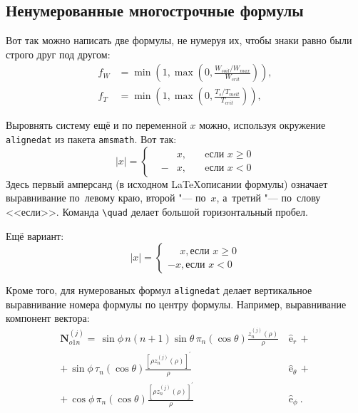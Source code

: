 \subsection{Ненумерованные многострочные формулы} \label{subsect1_3_2}

Вот так можно написать две формулы, не нумеруя их, чтобы знаки равно были строго друг под другом:
\begin{align}
	f_W & =  \min \left( 1, \max \left( 0, \frac{W_{soil} / W_{max}}{W_{crit}} \right)  \right), \nonumber \\
	f_T & =  \min \left( 1, \max \left( 0, \frac{T_s / T_{melt}}{T_{crit}} \right)  \right), \nonumber
\end{align}

Выровнять систему ещё и по переменной $ x $ можно, используя окружение \verb|alignedat| из пакета \verb|amsmath|. Вот так: 
\[
|x| = \left\{
\begin{alignedat}{2}
&&x, \quad &\text{eсли } x\geqslant 0 \\
&-&x, \quad & \text{eсли } x<0
\end{alignedat}
\right.
\]
Здесь первый амперсанд (в исходном \LaTeX описании формулы) означает выравнивание по~левому краю, второй "--- по~$ x $, а~третий "--- по~слову <<если>>. Команда \verb|\quad| делает большой горизонтальный пробел.

Ещё вариант:
\[
|x|=
\begin{cases}
\phantom{-}x, \text{если } x \geqslant 0 \\
-x, \text{если } x<0
\end{cases}
\]

Кроме того, для  нумерованых формул \verb|alignedat|  делает вертикальное
выравнивание номера формулы по центру формулы. Например,  выравнивание компонент вектора:
\begin{equation}
\label{eq:2p3}
\begin{alignedat}{2}
{\mathbf{N}}_{o1n}^{(j)} = \,{\sin} \phi\,n\!\left(n+1\right)
{\sin}\theta\,
\pi_n\!\left({\cos} \theta\right)
\frac{
	z_n^{(j)}\!\left( \rho \right)
}{\rho}\,
&{\boldsymbol{\hat{\mathrm e}}}_{r}\,+   \\
+\,
{\sin} \phi\,
\tau_n\!\left({\cos} \theta\right)
\frac{
	\left[\rho z_n^{(j)}\!\left( \rho \right)\right]^{\prime}
}{\rho}\,
&{\boldsymbol{\hat{\mathrm e}}}_{\theta}\,+   \\
+\,
{\cos} \phi\,
\pi_n\!\left({\cos} \theta\right)
\frac{
	\left[\rho z_n^{(j)}\!\left( \rho \right)\right]^{\prime}
}{\rho}\,
&{\boldsymbol{\hat{\mathrm e}}}_{\phi}\:.
\end{alignedat}
\end{equation}

